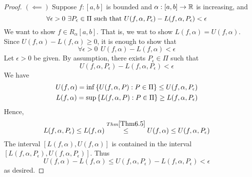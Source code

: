 \begin{proof}
    $(\impliedby)$ Suppose $f: [a,b]$ is bounded and $\alpha: [a,b] \to \mathbb{R}$ is increasing, and
    $$
    \forall \epsilon > 0 ~\exists P_\epsilon \in \Pi \text{ such that } U(f, \alpha, P_\epsilon) - L(f, \alpha, P_\epsilon) < \epsilon
    $$
    We want to show $f \in R_\alpha [a,b].$ That is, we wat to show $L(f, \alpha) = U(f, \alpha)$. Since $U(f, \alpha) - L(f, \alpha) \geq 0$, it is enough to show that
    $$
        \forall \epsilon > 0 ~~U(f, \alpha) - L(f, \alpha) < \epsilon
    $$
    Let $\epsilon > 0$ be given. By assumption, there exists $P_\epsilon \in \Pi$ such that
    $$
        U(f, \alpha, P_\epsilon) - L(f, \alpha, P_\epsilon) < \epsilon
    $$
    We have
    \begin{align*}
        U(f, \alpha) = \inf \left\{U(f, \alpha, P) : P \in \Pi\right\} \leq U(f, \alpha, P_\epsilon) \\
        L(f, \alpha) = \sup \left\{L(f, \alpha, P) : P \in \Pi\right\} \geq L(f, \alpha, P_\epsilon)
    \end{align*}
    Hence,
    $$
        L(f, \alpha , P_\epsilon) \leq L(f, \alpha) \overset{Thm \ref{Thm6.5}}{\leq} U(f, \alpha) \leq U(f, \alpha, P_\epsilon)
    $$
    The interval $[L(f, \alpha), U(f, \alpha)]$ is contained in the interval $[L(f, \alpha, P_\epsilon), U(f, \alpha, P_\epsilon)]$. Thus
    $$
        U(f, \alpha) - L(f, \alpha) \leq U(f, \alpha, P_\epsilon) - L(f, \alpha, P_\epsilon) < \epsilon
    $$
    as desired.
\end{proof}